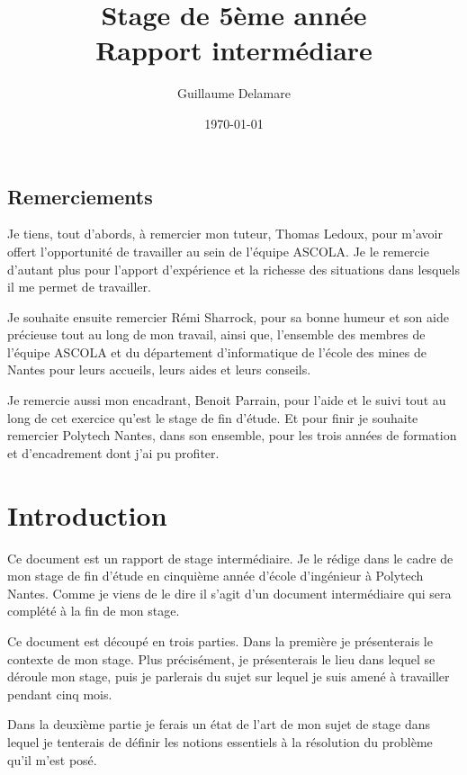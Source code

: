 \documentclass[a4paper, 11pt]{report}
\title{Stage de 5ème année\\ \large Rapport intermédiare}
\author{Guillaume Delamare}
\date{\today}
\begin{document}
\renewcommand{\labelitemi}{$\bullet$}
\renewcommand{\labelitemii}{$\diamond$}
\renewcommand{\labelitemiii}{$\ast$}
\renewcommand{\labelitemiv}{$\cdot$}

\maketitle

\section*{Remerciements}
Je tiens, tout d'abords, à remercier mon tuteur, Thomas Ledoux, pour m'avoir offert l'opportunité de travailler au sein de l'équipe ASCOLA. Je le remercie d'autant plus pour l'apport d'expérience et la richesse des situations dans lesquels il me permet de travailler.

Je souhaite ensuite remercier Rémi Sharrock, pour sa bonne humeur et son aide précieuse tout au long de mon travail, ainsi que, l'ensemble des membres de l'équipe ASCOLA et du département d'informatique de l'école des mines de Nantes pour leurs accueils, leurs aides et leurs conseils.

Je remercie aussi mon encadrant, Benoit Parrain, pour l'aide et le suivi tout au long de cet exercice qu'est le stage de fin d'étude. Et pour finir je souhaite remercier Polytech Nantes, dans son ensemble, pour les trois années de formation et d'encadrement dont j'ai pu profiter.


\newpage

\tableofcontents



\chapter{Introduction}
Ce document est un rapport de stage intermédiaire. Je le rédige dans le cadre de mon stage de fin d'étude en cinquième année d'école d'ingénieur à Polytech Nantes. Comme je viens de le dire il s'agit d'un document intermédiaire qui sera complété à la fin de mon stage. 

Ce document est découpé en trois parties. Dans la première je présenterais le contexte de mon stage. Plus précisément, je présenterais le lieu dans lequel se déroule mon stage, puis je parlerais du sujet sur lequel je suis amené à travailler pendant cinq mois.

Dans la deuxième partie je ferais un état de l'art de mon sujet de stage dans lequel je tenterais de définir les notions essentiels à la résolution du problème qu'il m'est posé.
\end{document}
